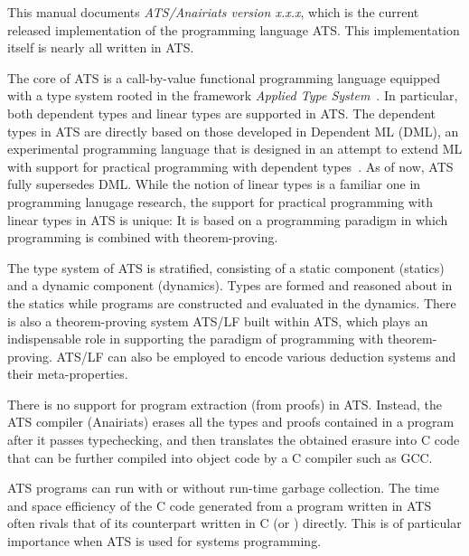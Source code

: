 This manual documents {\em ATS/Anairiats version x.x.x}, which is the
current released implementation of the programming language ATS. This
implementation itself is nearly all written in ATS.

The core of ATS is a call-by-value functional programming language equipped
with a type system rooted in the framework {\em Applied Type
System}~\cite{ATS-types03}. In particular, both dependent types and linear
types are supported in ATS. The dependent types in ATS are directly based
on those developed in Dependent ML (DML), an experimental programming
language that is designed in an attempt to extend ML with support for
practical programming with dependent types~\cite{DML-jfp07}. As of now, ATS
fully supersedes DML. While the notion of linear types is a familiar one in
programming lanugage research, the support for practical programming with
linear types in ATS is unique: It is based on a programming paradigm in
which programming is combined with theorem-proving.

The type system of ATS is stratified, consisting of a static component
(statics) and a dynamic component (dynamics). Types are formed and reasoned
about in the statics while programs are constructed and evaluated in the
dynamics. There is also a theorem-proving system ATS/LF built within ATS,
which plays an indispensable role in supporting the paradigm of programming
with theorem-proving. ATS/LF can also be employed to encode various
deduction systems and their meta-properties.

There is no support for program extraction (from proofs) in ATS. Instead,
the ATS compiler (Anairiats) erases all the types and proofs contained in a
program after it passes typechecking, and then translates the obtained
erasure into C code that can be further compiled into object code by a C
compiler such as GCC.

ATS programs can run with or without run-time garbage collection. The time
and space efficiency of the C code generated from a program written in ATS
often rivals that of its counterpart written in C (or \cplusplus)
directly. This is of particular importance when ATS is used for systems
programming.

